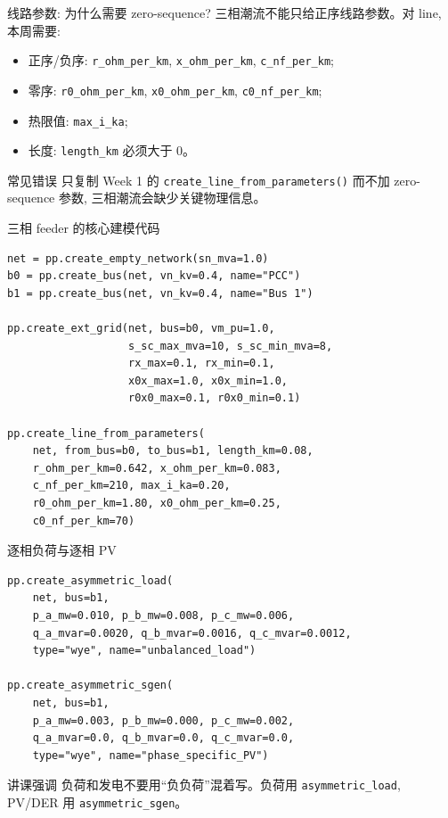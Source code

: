 \documentclass[aspectratio=169,10pt]{ctexbeamer}
\newcommand{\code}[1]{\texttt{#1}}
\begin{document}
\begin{frame}{线路参数: 为什么需要 zero-sequence?}
三相潮流不能只给正序线路参数。对 line, 本周需要:
\begin{itemize}
  \item 正序/负序: \code{r\_ohm\_per\_km}, \code{x\_ohm\_per\_km}, \code{c\_nf\_per\_km};
  \item 零序: \code{r0\_ohm\_per\_km}, \code{x0\_ohm\_per\_km}, \code{c0\_nf\_per\_km};
  \item 热限值: \code{max\_i\_ka};
  \item 长度: \code{length\_km} 必须大于 0。
\end{itemize}
\begin{alertblock}{常见错误}
只复制 Week 1 的 \code{create\_line\_from\_parameters()} 而不加 zero-sequence 参数, 三相潮流会缺少关键物理信息。
\end{alertblock}
\end{frame}

\begin{frame}[fragile]{三相 feeder 的核心建模代码}
\begin{lstlisting}
net = pp.create_empty_network(sn_mva=1.0)
b0 = pp.create_bus(net, vn_kv=0.4, name="PCC")
b1 = pp.create_bus(net, vn_kv=0.4, name="Bus 1")

pp.create_ext_grid(net, bus=b0, vm_pu=1.0,
                   s_sc_max_mva=10, s_sc_min_mva=8,
                   rx_max=0.1, rx_min=0.1,
                   x0x_max=1.0, x0x_min=1.0,
                   r0x0_max=0.1, r0x0_min=0.1)

pp.create_line_from_parameters(
    net, from_bus=b0, to_bus=b1, length_km=0.08,
    r_ohm_per_km=0.642, x_ohm_per_km=0.083,
    c_nf_per_km=210, max_i_ka=0.20,
    r0_ohm_per_km=1.80, x0_ohm_per_km=0.25,
    c0_nf_per_km=70)
\end{lstlisting}
\end{frame}

\begin{frame}[fragile]{逐相负荷与逐相 PV}
\begin{lstlisting}
pp.create_asymmetric_load(
    net, bus=b1,
    p_a_mw=0.010, p_b_mw=0.008, p_c_mw=0.006,
    q_a_mvar=0.0020, q_b_mvar=0.0016, q_c_mvar=0.0012,
    type="wye", name="unbalanced_load")

pp.create_asymmetric_sgen(
    net, bus=b1,
    p_a_mw=0.003, p_b_mw=0.000, p_c_mw=0.002,
    q_a_mvar=0.0, q_b_mvar=0.0, q_c_mvar=0.0,
    type="wye", name="phase_specific_PV")
\end{lstlisting}
\begin{block}{讲课强调}
负荷和发电不要用“负负荷”混着写。负荷用 \code{asymmetric\_load}, PV/DER 用 \code{asymmetric\_sgen}。
\end{block}
\end{frame}
\end{document}
